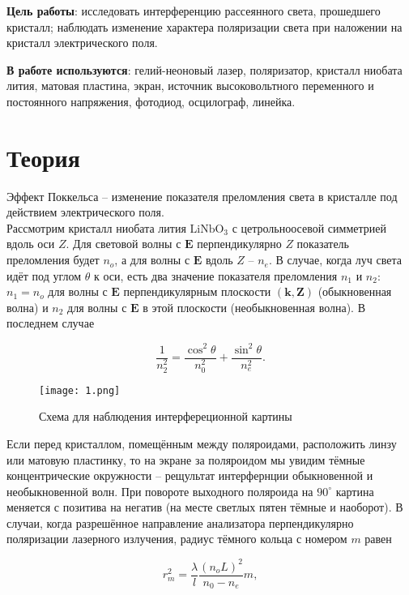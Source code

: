 




\textbf{Цель работы}: исследовать интерференцию рассеянного света, прошедшего кристалл; наблюдать изменение характера поляризации света при наложении на кристалл электрического поля.

\textbf{В работе используются}: гелий-неоновый лазер, поляризатор, кристалл ниобата лития, матовая пластина, экран, источник высоковольтного переменного и постоянного напряжения, фотодиод, осцилограф, линейка.

\section*{Теория}
Эффект Поккельса -- изменение показателя преломления света в кристалле под действием электрического поля.\\
Рассмотрим кристалл ниобата лития $\text{LiNbO}_3$ с цетрольноосевой симметрией вдоль оси $Z$. Для световой волны с $\mathbf{E}$ перпендикулярно $Z$ показатель преломления будет $n_o$, а для волны с $\mathbf{E}$ вдоль $Z$ -- $n_e$. В случае, когда луч света идёт под углом $\theta$ к оси, есть два значение показателя преломления $n_1$ и $n_2$: $n_1 = n_o$ для волны с $\mathbf{E}$ перпендикулярным плоскости $(\mathbf{k},\mathbf{Z})$ (обыкновенная волна) и $n_2$ для волны с $\mathbf{E}$ в этой плоскости (необыкновенная волна). В последнем случае

\begin{equation}
\dfrac{1}{n_2^2}=\dfrac{\cos^2 \theta}{n_0^2}+\dfrac{\sin^2 \theta}{n_e^2}.
\end{equation}

\begin{figure}[h!]
	\texttt{[image: 1.png]}
	\centering
	\caption{Схема для наблюдения интерфереционной картины}
	\label{fig:1}
\end{figure}

Если перед кристаллом, помещённым между поляроидами, расположить линзу или матовую пластинку, то на экране за поляроидом мы увидим тёмные концентрические окружности -- рещультат интерфернции обыкновенной и необыкновенной волн. При повороте выходного поляроида на $90^\circ$ картина меняется с позитива на негатив (на месте светлых пятен тёмные и наоборот). В случаи, когда разрешённое направление анализатора перпендикулярно поляризации лазерного излучения, радиус тёмного кольца с номером $m$ равен

\begin{equation} \label{eq:r(m)}
r_m^2 = \dfrac{\lambda}{l} \dfrac{(n_oL)^2}{n_0 - n_e}m,
\end{equation}

